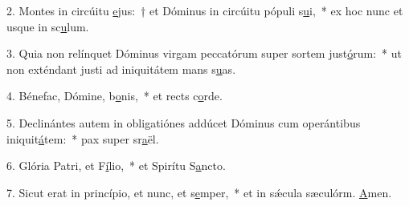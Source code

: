 2. Montes in circúitu \uline{e}jus:~† et Dóminus in circúitu pópuli s\uline{u}i,~* ex hoc nunc et usque in sc\uline{u}lum.\par 
3. Quia non relínquet Dóminus virgam peccatórum super sortem just\uline{ó}rum:~* ut non exténdant justi ad iniquitátem mans s\uline{u}as.\par 
4. Bénefac, Dómine, b\uline{o}nis,~* et rects c\uline{o}rde.\par 
5. Declinántes autem in obligatiónes addúcet Dóminus cum operántibus iniquit\uline{á}tem:~* pax super sr\uline{a}ël.\par 
6. Glória Patri, et F\uline{í}lio,~* et Spirítu S\uline{a}ncto.\par 
7. Sicut erat in princípio, et nunc, et s\uline{e}mper,~* et in sǽcula sæculórm. \uline{A}men.\par 

